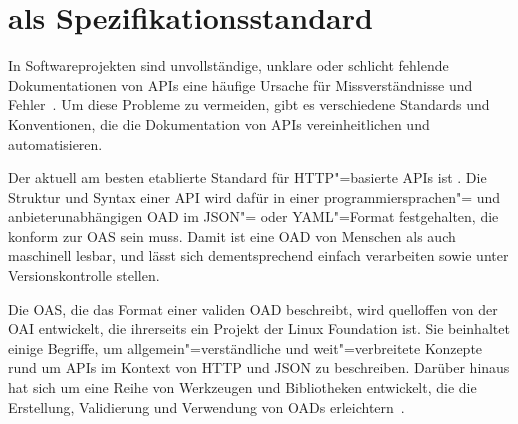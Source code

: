 \chapter{\OA als Spezifikationsstandard} \label{ch:openapi}
In Softwareprojekten sind unvollständige, unklare oder schlicht fehlende Dokumentationen von \acp{API} eine häufige Ursache für Missverständnisse und Fehler~\cite{ope23a}.
Um diese Probleme zu vermeiden, gibt es verschiedene Standards und Konventionen, die die Dokumentation von \acp{API} vereinheitlichen und automatisieren.

Der aktuell am besten etablierte Standard für \ac{HTTP}"=basierte \acp{API} ist \OA\@.
Die Struktur und Syntax einer \ac{API} wird dafür in einer programmiersprachen"= und anbieterunabhängigen \ac{OAD} im \acs{JSON}"= oder \acs{YAML}"=Format festgehalten, die konform zur \ac{OAS} sein muss.
Damit ist eine \ac{OAD} von Menschen als auch maschinell lesbar, und lässt sich dementsprechend einfach verarbeiten sowie unter Versionskontrolle stellen.

Die \ac{OAS}, die das Format einer validen \ac{OAD} beschreibt, wird quelloffen von der \ac{OAI} entwickelt, die ihrerseits ein Projekt der Linux Foundation ist.
Sie beinhaltet einige Begriffe, um allgemein"=verständliche und weit"=verbreitete Konzepte rund um \acp{API} im Kontext von \acs{HTTP} und \acs{JSON} zu beschreiben.
Darüber hinaus hat sich um \OA eine Reihe von Werkzeugen und Bibliotheken entwickelt, die die Erstellung, Validierung und Verwendung von \acp{OAD} erleichtern~\cites{ope,ope23,ope23a}.

